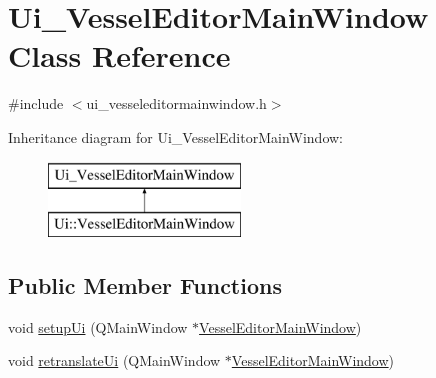 \hypertarget{class_ui___vessel_editor_main_window}{}\section{Ui\+\_\+\+Vessel\+Editor\+Main\+Window Class Reference}
\label{class_ui___vessel_editor_main_window}


{\ttfamily \#include $<$ui\+\_\+vesseleditormainwindow.\+h$>$}

Inheritance diagram for Ui\+\_\+\+Vessel\+Editor\+Main\+Window\+:\begin{figure}[H]
\begin{center}
\leavevmode
\includegraphics[height=2.000000cm]{d5/dde/class_ui___vessel_editor_main_window}
\end{center}
\end{figure}
\subsection*{Public Member Functions}
\begin{DoxyCompactItemize}
\item 
void \mbox{\hyperlink{class_ui___vessel_editor_main_window_a449b84b27305b15beb20f2ad93805371}{setup\+Ui}} (Q\+Main\+Window $\ast$\mbox{\hyperlink{class_vessel_editor_main_window}{Vessel\+Editor\+Main\+Window}})
\item 
void \mbox{\hyperlink{class_ui___vessel_editor_main_window_acdd21554bdf10bc52f7ab5ff53f80638}{retranslate\+Ui}} (Q\+Main\+Window $\ast$\mbox{\hyperlink{class_vessel_editor_main_window}{Vessel\+Editor\+Main\+Window}})
\end{DoxyCompactItemize}
